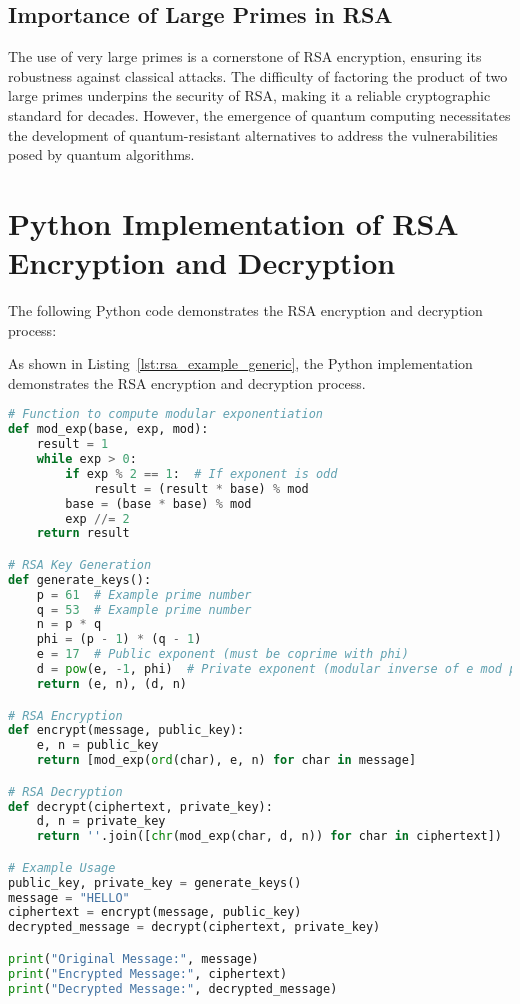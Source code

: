 \documentclass[12pt,a4paper]{report}
\begin{document}
\subsection{Importance of Large Primes in RSA}
The use of very large primes is a cornerstone of RSA encryption, ensuring its robustness against classical attacks. The difficulty of factoring the product of two large primes underpins the security of RSA, making it a reliable cryptographic standard for decades. However, the emergence of quantum computing necessitates the development of quantum-resistant alternatives to address the vulnerabilities posed by quantum algorithms.

\section{Python Implementation of RSA Encryption and Decryption}
The following Python code demonstrates the RSA encryption and decryption process:


As shown in Listing~\ref{lst:rsa_example_generic}, the Python implementation demonstrates the RSA encryption and decryption process.

\begin{lstlisting}[language=Python, caption=RSA Encryption and Decryption Example, label={lst:rsa_example_generic}]
# Function to compute modular exponentiation
def mod_exp(base, exp, mod):
    result = 1
    while exp > 0:
        if exp % 2 == 1:  # If exponent is odd
            result = (result * base) % mod
        base = (base * base) % mod
        exp //= 2
    return result

# RSA Key Generation
def generate_keys():
    p = 61  # Example prime number
    q = 53  # Example prime number
    n = p * q
    phi = (p - 1) * (q - 1)
    e = 17  # Public exponent (must be coprime with phi)
    d = pow(e, -1, phi)  # Private exponent (modular inverse of e mod phi)
    return (e, n), (d, n)

# RSA Encryption
def encrypt(message, public_key):
    e, n = public_key
    return [mod_exp(ord(char), e, n) for char in message]

# RSA Decryption
def decrypt(ciphertext, private_key):
    d, n = private_key
    return ''.join([chr(mod_exp(char, d, n)) for char in ciphertext])

# Example Usage
public_key, private_key = generate_keys()
message = "HELLO"
ciphertext = encrypt(message, public_key)
decrypted_message = decrypt(ciphertext, private_key)

print("Original Message:", message)
print("Encrypted Message:", ciphertext)
print("Decrypted Message:", decrypted_message)
\end{lstlisting}
\end{document}
